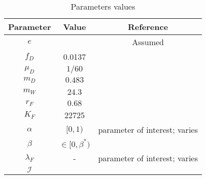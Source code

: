 \documentclass{article}
\newcommand{\lfw}{\lambda_{F}}
\begin{document}
\begin{table}[ht]
\centering
\begin{tabular}{|c|c|c|}
\hline 
Parameter & Value & Reference \\ 
\hline 
$e$ & & Assumed\\
$f_D$ & 0.0137 & \cite{koppert_consommation_1996}\\
$\mu_D$ & $1/60$ & \cite{ins_demographie}\\
$m_D$ & $0.483$ & \cite{avila_interpreting_2019}\\
$m_W$ & 24.3 & \cite{avila_interpreting_2019}\\
$r_F$ & $0.68$ & \cite{robinson_intrinsic_1986}\\
$K_F$ & 22725 & \cite{janson_ecological_1990} \\
$\alpha$ & $[0, 1)$ & parameter of interest; varies \\
$\beta$ & $\in [0, \beta^*)$ &  \\
$\lfw$ & - & parameter of interest; varies \\
$\mathcal{I}$ &  & \\
\hline
\end{tabular}

\caption{Parameters values}
\end{table}
\end{document}
